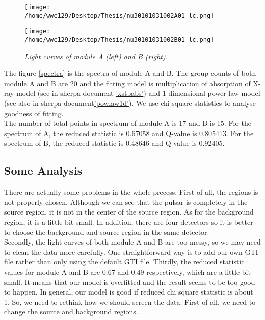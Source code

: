 \documentclass[12pt]{report}
\newcommand{\mycaption}[1]{\caption{\textit{\footnotesize #1}}}
\begin{document}
        \begin{figure}[h]
          \begin{minipage}{0.45\textwidth}
            \begin{flushleft}
                \texttt{[image: /home/wwc129/Desktop/Thesis/nu30101031002A01\_lc.png]}
              \end{flushleft}
            \end{minipage}
          \hspace{0.1cm} 
          \begin{minipage}{0.45\textwidth}
            \texttt{[image: /home/wwc129/Desktop/Thesis/nu30101031002B01\_lc.png]}
          \end{minipage}
          \mycaption{Light curves of module A (left) and B (right).}
          \label{fig:lightcurves}
        \end{figure}
        \indent The figure \ref{spectra} is the spectra of module A and B. The group counts of both module A and B are
        20 and the fitting model is multiplication of absorption of X-ray model (see in sherpa document 
        \href{http://%
        cxc.harvard.edu/sherpa/ahelp/xstbabs.html}{'xstbabs'}) and 1 dimensional power law model (see also in sherpa 
        document\href{http://cxc.harvard.edu/sherpa/ahelp/powlaw1d.html}{'powlaw1d'}). We use chi square statistics
        to analyse goodness of fitting.\\
        \indent
        The number of total points in spectrum of module A is 17 and B is 15. For the spectrum of A, the 
        reduced statistic is 0.67058 and Q-value is 0.805413. For the spectrum of B, the reduced statistic is 0.48646
        and Q-value is 0.92405. 
        \subsection*{Some Analysis}
        \indent There are actually some problems in the whole precess. First of all, the regions is not properly 
        chosen. Although we can see that the pulsar is completely in the source region, it is not in the center of 
        the source region. As for the background region, it is a little bit small. In addition, there are four 
        detectors so it is better to choose the background and source region in the same detector. \\
        \indent Secondly, the light curves of both module A and B are too messy, so we may need to clean the data
        more carefully. One straightforward way is to add our own GTI file rather than only using the default GTI 
        file. Thirdly, the reduced statistic values for module A and B are 0.67 and 0.49 respectively, which are 
        a little bit small. It means that our model is overfitted and the result seems to be too good to happen. In 
        general, our model is good if reduced chi square statistic is about 1. 
        \indent So, we need to rethink how we should screen the data. First of all, we need to change the source and 
        background regions.  
        
\end{document}
